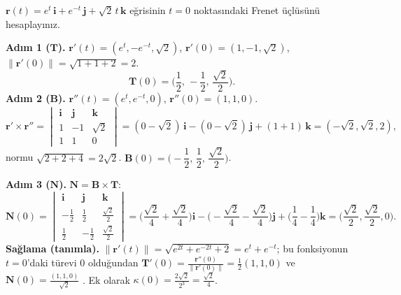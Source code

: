 \begin{soru}
$\mathbf r(t)=e^t\,\mathbf i+e^{-t}\,\mathbf j+\sqrt2\,t\,\mathbf k$ eğrisinin $t=0$ noktasındaki Frenet üçlüsünü hesaplayınız.
\end{soru}
\begin{cevap}
\textbf{Adım 1 ($\mathbf T$).} $\mathbf r'(t)=(e^t,-e^{-t},\sqrt2)$, $\mathbf r'(0)=(1,-1,\sqrt2)$, $\|\mathbf r'(0)\|=\sqrt{1+1+2}=2$.
\[ \mathbf T(0)=\Big(\frac12,\,-\frac12,\,\frac{\sqrt2}{2}\Big). \]
\textbf{Adım 2 ($\mathbf B$).} $\mathbf r''(t)=(e^t,e^{-t},0)$, $\mathbf r''(0)=(1,1,0)$.
\[ \mathbf r'\times\mathbf r''=\begin{vmatrix}\mathbf i&\mathbf j&\mathbf k\\1&-1&\sqrt2\\1&1&0\end{vmatrix}=(0-\sqrt2)\,\mathbf i-(0-\sqrt2)\,\mathbf j+(1+1)\,\mathbf k=(-\sqrt2,\sqrt2,2), \]
normu $\sqrt{2+2+4}=2\sqrt2$. \quad $\mathbf B(0)=\Big(-\dfrac12,\,\dfrac12,\,\dfrac{\sqrt2}{2}\Big)$.

\textbf{Adım 3 ($\mathbf N$).} $\mathbf N=\mathbf B\times\mathbf T$:
\[ \mathbf N(0)=\begin{vmatrix}\mathbf i&\mathbf j&\mathbf k\\-\frac12&\frac12&\frac{\sqrt2}2\\\frac12&-\frac12&\frac{\sqrt2}2\end{vmatrix}
=\Big(\frac{\sqrt2}{4}+\frac{\sqrt2}{4}\Big)\mathbf i-\Big(-\frac{\sqrt2}{4}-\frac{\sqrt2}{4}\Big)\mathbf j+\Big(\frac14-\frac14\Big)\mathbf k=\Big(\frac{\sqrt2}{2},\frac{\sqrt2}{2},0\Big). \]
\textbf{Sağlama (tanımla).} $\|\mathbf r'(t)\|=\sqrt{e^{2t}+e^{-2t}+2}=e^t+e^{-t}$; bu fonksiyonun $t=0$'daki türevi $0$ olduğundan
$\mathbf T'(0)=\frac{\mathbf r''(0)}{\|\mathbf r'(0)\|}=\frac12(1,1,0)$ ve $\mathbf N(0)=\frac{(1,1,0)}{\sqrt2}$ \checkmark. Ek olarak
$\kappa(0)=\frac{2\sqrt2}{2^3}=\frac{\sqrt2}{4}$.
\end{cevap}

